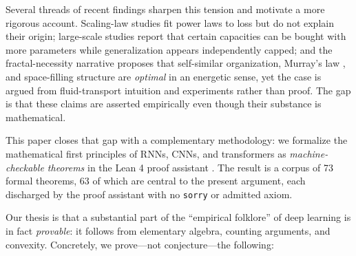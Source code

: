 \documentclass[conference]{IEEEtran}
\begin{document}
Several threads of recent findings sharpen this tension and motivate a more
rigorous account. Scaling-law studies \cite{kaplan2020scaling,hoffmann2022train}
fit power laws to loss but do not explain their origin; large-scale studies
report that certain capacities can be bought with more parameters while
generalization appears independently capped; and the fractal-necessity
narrative \cite{shape2026} proposes that self-similar organization, Murray's law
\cite{murray1926}, and space-filling structure are \emph{optimal} in an
energetic sense, yet the case is argued from fluid-transport intuition and
experiments rather than proof. The gap is that these claims are asserted
empirically even though their substance is mathematical.

This paper closes that gap with a complementary methodology: we formalize the
mathematical first principles of RNNs, CNNs, and transformers as
\emph{machine-checkable theorems} in the Lean 4 proof assistant
\cite{lean4,mathlib,avigad2020}. The result is a corpus of 73 formal theorems,
63 of which are central to the present argument, each discharged by the proof
assistant with no \texttt{sorry} or admitted axiom.

Our thesis is that a substantial part of the ``empirical folklore'' of deep
learning is in fact \emph{provable}: it follows from elementary algebra,
counting arguments, and convexity. Concretely, we prove---not conjecture---the
following:
\end{document}

